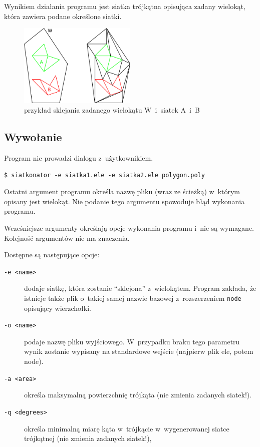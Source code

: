 \documentclass[a4paper]{article}
\begin{document}
Wynikiem działania programu jest siatka trójkątna opisująca zadany wielokąt, która zawiera podane określone siatki.

\begin{figure}[h]
  \centering
  \includegraphics[width=0.5\textwidth]{ilustracja.png}
  \caption{przykład sklejania zadanego wielokątu W~i~siatek A~i~B}
\end{figure}

\subsection{Wywołanie}
Program nie prowadzi dialogu z~użytkownikiem.

\begin{lstlisting}[caption=Przykładowe wywołanie]
  $ siatkonator -e siatka1.ele -e siatka2.ele polygon.poly
\end{lstlisting}

Ostatni argument programu określa nazwę pliku (wraz ze ścieżką) w~którym opisany jest wielokąt.
Nie podanie tego argumentu spowoduje błąd wykonania programu.

Wcześniejsze argumenty określają opcje wykonania programu i~nie są wymagane.
Kolejność argumentów nie ma znaczenia.

Dostępne są następujące opcje:
\begin{description}
  \item[\texttt{-e <name>}] dodaje siatkę, która zostanie ``sklejona'' z~wielokątem. Program zakłada, że istnieje także plik o~takiej samej nazwie bazowej z~rozszerzeniem \texttt{node} opisujący wierzchołki.
  \item[\texttt{-o <name>}] podaje nazwę pliku wyjściowego. W~przypadku braku tego parametru wynik zostanie wypisany na standardowe wejście (najpierw plik ele, potem node).
  \item[\texttt{-a <area>}] określa maksymalną powierzchnię trójkąta (nie zmienia zadanych siatek!).
  \item[\texttt{-q <degrees>}] określa minimalną miarę kąta w~trójkącie w~wygenerowanej siatce trójkątnej (nie zmienia zadanych siatek!),
\end{description}
\end{document}
